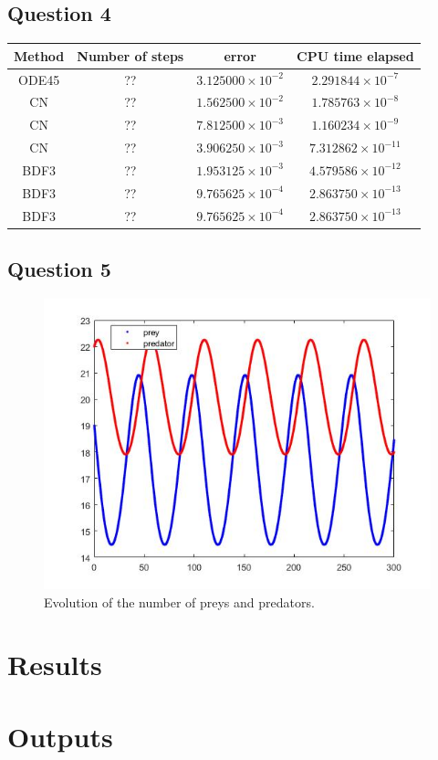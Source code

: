 \documentclass[a4paper, 11pt]{article}
\begin{document}
	\subsection*{Question 4}
	
	\begin{table}[H]
		\centering
		\begin{tabular}{c|c|c|c}
			\textbf{Method} & \textbf{Number of steps} & \textbf{error}  & \textbf{CPU time elapsed}  \\ \hline
			ODE45 & ?? & $ 3.125000\times 10^{-2} $ & $ 2.291844\times 10^{-7} $ \\ \hline
			CN & ?? &$ 1.562500\times 10^{-2} $ & $ 1.785763\times 10^{-8} $ \\ \hline
			CN & ?? &$ 7.812500\times 10^{-3} $ & $ 1.160234\times 10^{-9} $ \\ \hline
			CN & ?? &$ 3.906250\times 10^{-3} $ & $ 7.312862\times 10^{-11} $ \\ \hline
			BDF3 & ?? &$ 1.953125\times 10^{-3} $ & $ 4.579586\times 10^{-12} $ \\ \hline
			BDF3 & ?? &$ 9.765625\times 10^{-4} $ & $ 2.863750\times 10^{-13} $ \\ \hline
			BDF3 & ?? &$ 9.765625\times 10^{-4} $ & $ 2.863750\times 10^{-13} $ \\ \hline
		\end{tabular}
	\end{table}
	
	\subsection*{Question 5}
	\begin{figure}[H]
		\centering
		\includegraphics[width=\linewidth]{ex5.jpg}
		\caption{Evolution of the number of preys and predators.}
		\label{fig:ex5}
	\end{figure}
	
	
	
	
	
	\section*{Results}
	
	
	\section*{Outputs}
	
	
	
\end{document}

